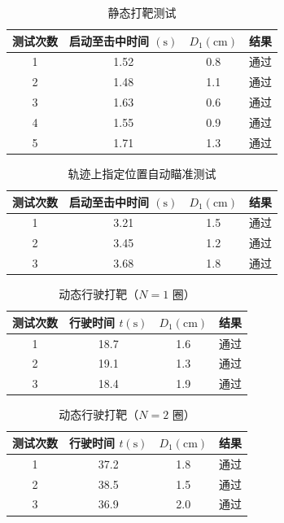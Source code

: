 \documentclass[zihao=-4,fontset=none]{ctexart}
\begin{document}
\begin{table}[H]
    \centering
    \caption{静态打靶测试}
    \label{tab:e_static}
    \begin{tabular}{cccc}
        \toprule
        测试次数 & 启动至击中时间 $(\text{s})$ & $D_1(\text{cm})$ & 结果 \\
        \midrule
        1 & 1.52 & 0.8 & 通过 \\
        2 & 1.48 & 1.1 & 通过 \\
        3 & 1.63 & 0.6 & 通过 \\
        4 & 1.55 & 0.9 & 通过 \\
        5 & 1.71 & 1.3 & 通过 \\
        \bottomrule
    \end{tabular}
\end{table}

\begin{table}[H]
    \centering
    \caption{轨迹上指定位置自动瞄准测试}
    \label{tab:e_pos}
    \begin{tabular}{cccc}
        \toprule
        测试次数 & 启动至击中时间 $(\text{s})$ & $D_1(\text{cm})$ & 结果 \\
        \midrule
        1 & 3.21 & 1.5 & 通过 \\
        2 & 3.45 & 1.2 & 通过 \\
        3 & 3.68 & 1.8 & 通过 \\
        \bottomrule
    \end{tabular}
\end{table}

\begin{table}[H]
    \centering
    \caption{动态行驶打靶（$N=1$ 圈）}
    \label{tab:e_dyn1}
    \begin{tabular}{cccc}
        \toprule
        测试次数 & 行驶时间 $t(\text{s})$ & $D_1(\text{cm})$ & 结果 \\
        \midrule
        1 & 18.7 & 1.6 & 通过 \\
        2 & 19.1 & 1.3 & 通过 \\
        3 & 18.4 & 1.9 & 通过 \\
        \bottomrule
    \end{tabular}
\end{table}

\begin{table}[H]
    \centering
    \caption{动态行驶打靶（$N=2$ 圈）}
    \label{tab:e_dyn2}
    \begin{tabular}{cccc}
        \toprule
        测试次数 & 行驶时间 $t(\text{s})$ & $D_1(\text{cm})$ & 结果 \\
        \midrule
        1 & 37.2 & 1.8 & 通过 \\
        2 & 38.5 & 1.5 & 通过 \\
        3 & 36.9 & 2.0 & 通过 \\
        \bottomrule
    \end{tabular}
\end{table}
\end{document}
